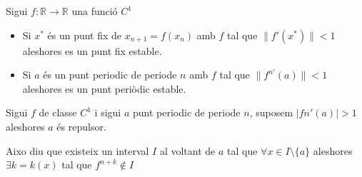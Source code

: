 \documentclass[../main.tex]{subfiles}
\begin{document}
\begin{teorema}
    Sigui $f: \mathbb{R} \rightarrow \mathbb{R}$ una funció $C^1$ 
    \begin{itemize}
        \item Si $x^*$ és un punt fix de $x_{n+1} = f(x_n)$ amb $f$ tal que $\|f'(x^*)\| < 1$ aleshores es un punt fix estable.
        \item Si $a$ és un punt periodic de periode $n$ amb $f$ tal que $\|f^{n'}(a)\| < 1$ aleshores es un punt periòdic estable.
    \end{itemize}
\end{teorema}
\begin{teorema}
    Sigui $f$ de classe $C^1$ i sigui $a$ punt periodic de periode $n$, suposem $|f{n}'(a)| > 1$ aleshores $a$ és repulsor.
\end{teorema}
Aixo diu que existeix un interval $I$ al voltant de $a$ tal que $\forall x \in I\setminus\{a\}$ aleshores $\exists k = k(x)$ tal que $f^{n+k} \not\in I$
\end{document}
